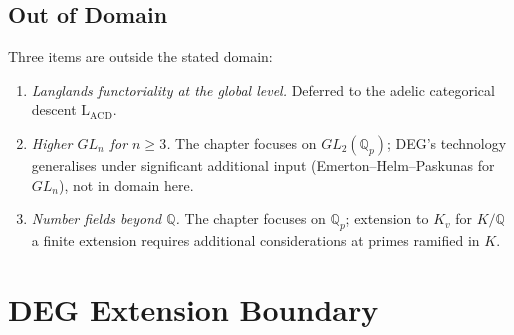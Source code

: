 \subsection{Out of Domain}

Three items are outside the stated domain:

\begin{enumerate}
\item \emph{Langlands functoriality at the global level.} Deferred to
the adelic categorical descent \(\mathrm{L}_{\mathrm{ACD}}\).
\item \emph{Higher \(GL_{n}\) for \(n\geq 3\).} The chapter focuses on
\(GL_{2}(\mathbb{Q}_{p})\); DEG's technology generalises under
significant additional input (Emerton--Helm--Paskunas for
\(GL_{n}\)), not in domain here.
\item \emph{Number fields beyond \(\mathbb{Q}\).} The chapter focuses
on \(\mathbb{Q}_{p}\); extension to \(K_{v}\) for \(K/\mathbb{Q}\) a
finite extension requires additional considerations at primes
ramified in \(K\).
\end{enumerate}

\section{DEG Extension Boundary}
\label{v4-arith:deg-f1a:summary}

